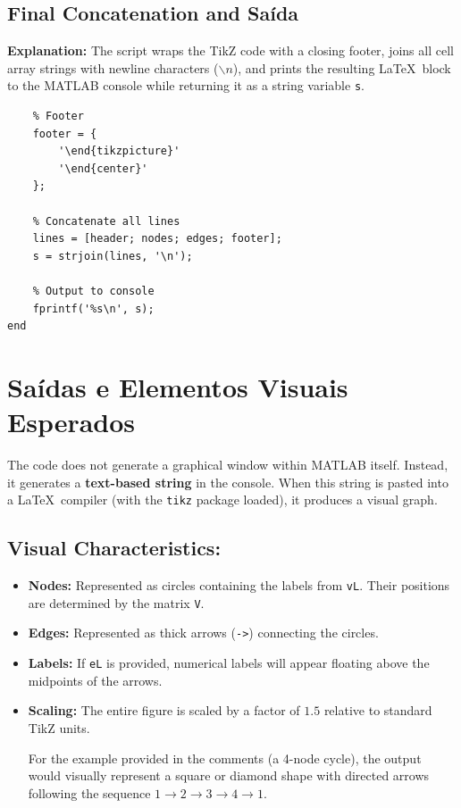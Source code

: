 \subsection{Final Concatenation and Saída}
\textbf{Explanation:} The script wraps the TikZ code with a closing footer, joins all cell array strings with newline characters ($\backslash n$), and prints the resulting \LaTeX\ block to the MATLAB console while returning it as a string variable \texttt{s}.
\begin{lstlisting}
    % Footer
    footer = {
        '\end{tikzpicture}'
        '\end{center}'
    };

    % Concatenate all lines
    lines = [header; nodes; edges; footer];
    s = strjoin(lines, '\n');

    % Output to console
    fprintf('%s\n', s);
end
\end{lstlisting}

\section{Saídas e Elementos Visuais Esperados}
The code does not generate a graphical window within MATLAB itself. Instead, it generates a \textbf{text-based string} in the console. When this string is pasted into a \LaTeX\ compiler (with the \texttt{tikz} package loaded), it produces a visual graph.

\subsection*{Visual Characteristics:}
\begin{itemize}
    \item \textbf{Nodes:} Represented as circles containing the labels from \texttt{vL}. Their positions are determined by the matrix \texttt{V}.
    \item \textbf{Edges:} Represented as thick arrows (\texttt{->}) connecting the circles.
    \item \textbf{Labels:} If \texttt{eL} is provided, numerical labels will appear floating above the midpoints of the arrows.
    \item \textbf{Scaling:} The entire figure is scaled by a factor of $1.5$ relative to standard TikZ units.


For the example provided in the comments (a 4-node cycle), the output would visually represent a square or diamond shape with directed arrows following the sequence $1 \to 2 \to 3 \to 4 \to 1$.
\end{itemize}